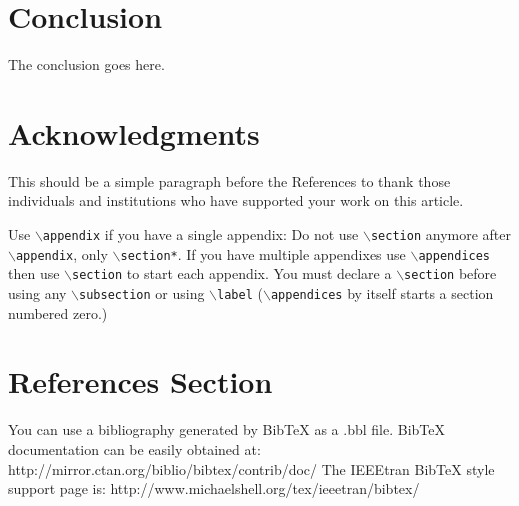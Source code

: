 \documentclass[lettersize,journal]{IEEEtran}
\begin{document}
 \section{Conclusion}\label{sec:conclusion}
 The conclusion goes here.


 \section*{Acknowledgments}
 This should be a simple paragraph before the References to thank those individuals and institutions who have supported your work on this article.



  {
 Use $\backslash${\tt{appendix}} if you have a single appendix:
 Do not use $\backslash${\tt{section}} anymore after $\backslash${\tt{appendix}}, only $\backslash${\tt{section*}}.
 If you have multiple appendixes use $\backslash${\tt{appendices}} then use $\backslash${\tt{section}} to start each appendix.
 You must declare a $\backslash${\tt{section}} before using any $\backslash${\tt{subsection}} or using $\backslash${\tt{label}} ($\backslash${\tt{appendices}} by itself
 starts a section numbered zero.)}




 \section{References Section}
 You can use a bibliography generated by BibTeX as a .bbl file.
 BibTeX documentation can be easily obtained at:
 http://mirror.ctan.org/biblio/bibtex/contrib/doc/
 The IEEEtran BibTeX style support page is:
 http://www.michaelshell.org/tex/ieeetran/bibtex/

 
 
%
%
\end{document}
